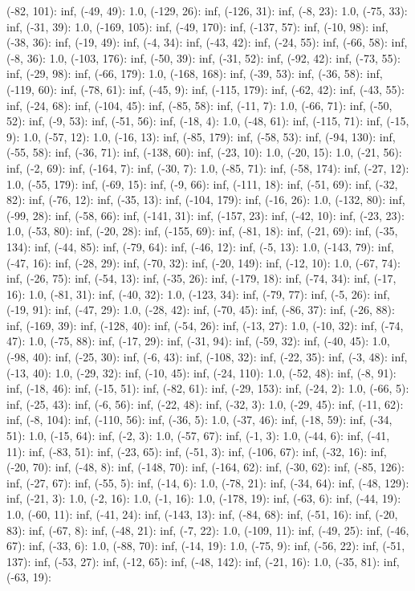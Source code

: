 \documentclass[parskip=half]{scrartcl}
\begin{document}
(-82, 101): inf, (-49, 49): 1.0, (-129, 26): inf, (-126, 31): inf, (-8, 23): 1.0, (-75, 33): inf, (-31, 39): 1.0, (-169, 105): inf, (-49, 170): inf, (-137, 57): inf, (-10, 98): inf, (-38, 36): inf, (-19, 49): inf, (-4, 34): inf, (-43, 42): inf, (-24, 55): inf, (-66, 58): inf, (-8, 36): 1.0, (-103, 176): inf, (-50, 39): inf, (-31, 52): inf, (-92, 42): inf, (-73, 55): inf, (-29, 98): inf, (-66, 179): 1.0, (-168, 168): inf, (-39, 53): inf, (-36, 58): inf, (-119, 60): inf, (-78, 61): inf, (-45, 9): inf, (-115, 179): inf, (-62, 42): inf, (-43, 55): inf, (-24, 68): inf, (-104, 45): inf, (-85, 58): inf, (-11, 7): 1.0, (-66, 71): inf, (-50, 52): inf, (-9, 53): inf, (-51, 56): inf, (-18, 4): 1.0, (-48, 61): inf, (-115, 71): inf, (-15, 9): 1.0, (-57, 12): 1.0, (-16, 13): inf, (-85, 179): inf, (-58, 53): inf, (-94, 130): inf, (-55, 58): inf, (-36, 71): inf, (-138, 60): inf, (-23, 10): 1.0, (-20, 15): 1.0, (-21, 56): inf, (-2, 69): inf, (-164, 7): inf, (-30, 7): 1.0, (-85, 71): inf, (-58, 174): inf, (-27, 12): 1.0, (-55, 179): inf, (-69, 15): inf, (-9, 66): inf, (-111, 18): inf, (-51, 69): inf, (-32, 82): inf, (-76, 12): inf, (-35, 13): inf, (-104, 179): inf, (-16, 26): 1.0, (-132, 80): inf, (-99, 28): inf, (-58, 66): inf, (-141, 31): inf, (-157, 23): inf, (-42, 10): inf, (-23, 23): 1.0, (-53, 80): inf, (-20, 28): inf, (-155, 69): inf, (-81, 18): inf, (-21, 69): inf, (-35, 134): inf, (-44, 85): inf, (-79, 64): inf, (-46, 12): inf, (-5, 13): 1.0, (-143, 79): inf, (-47, 16): inf, (-28, 29): inf, (-70, 32): inf, (-20, 149): inf, (-12, 10): 1.0, (-67, 74): inf, (-26, 75): inf, (-54, 13): inf, (-35, 26): inf, (-179, 18): inf, (-74, 34): inf, (-17, 16): 1.0, (-81, 31): inf, (-40, 32): 1.0, (-123, 34): inf, (-79, 77): inf, (-5, 26): inf, (-19, 91): inf, (-47, 29): 1.0, (-28, 42): inf, (-70, 45): inf, (-86, 37): inf, (-26, 88): inf, (-169, 39): inf, (-128, 40): inf, (-54, 26): inf, (-13, 27): 1.0, (-10, 32): inf, (-74, 47): 1.0, (-75, 88): inf, (-17, 29): inf, (-31, 94): inf, (-59, 32): inf, (-40, 45): 1.0, (-98, 40): inf, (-25, 30): inf, (-6, 43): inf, (-108, 32): inf, (-22, 35): inf, (-3, 48): inf, (-13, 40): 1.0, (-29, 32): inf, (-10, 45): inf, (-24, 110): 1.0, (-52, 48): inf, (-8, 91): inf, (-18, 46): inf, (-15, 51): inf, (-82, 61): inf, (-29, 153): inf, (-24, 2): 1.0, (-66, 5): inf, (-25, 43): inf, (-6, 56): inf, (-22, 48): inf, (-32, 3): 1.0, (-29, 45): inf, (-11, 62): inf, (-8, 104): inf, (-110, 56): inf, (-36, 5): 1.0, (-37, 46): inf, (-18, 59): inf, (-34, 51): 1.0, (-15, 64): inf, (-2, 3): 1.0, (-57, 67): inf, (-1, 3): 1.0, (-44, 6): inf, (-41, 11): inf, (-83, 51): inf, (-23, 65): inf, (-51, 3): inf, (-106, 67): inf, (-32, 16): inf, (-20, 70): inf, (-48, 8): inf, (-148, 70): inf, (-164, 62): inf, (-30, 62): inf, (-85, 126): inf, (-27, 67): inf, (-55, 5): inf, (-14, 6): 1.0, (-78, 21): inf, (-34, 64): inf, (-48, 129): inf, (-21, 3): 1.0, (-2, 16): 1.0, (-1, 16): 1.0, (-178, 19): inf, (-63, 6): inf, (-44, 19): 1.0, (-60, 11): inf, (-41, 24): inf, (-143, 13): inf, (-84, 68): inf, (-51, 16): inf, (-20, 83): inf, (-67, 8): inf, (-48, 21): inf, (-7, 22): 1.0, (-109, 11): inf, (-49, 25): inf, (-46, 67): inf, (-33, 6): 1.0, (-88, 70): inf, (-14, 19): 1.0, (-75, 9): inf, (-56, 22): inf, (-51, 137): inf, (-53, 27): inf, (-12, 65): inf, (-48, 142): inf, (-21, 16): 1.0, (-35, 81): inf, (-63, 19): 
\end{document}
